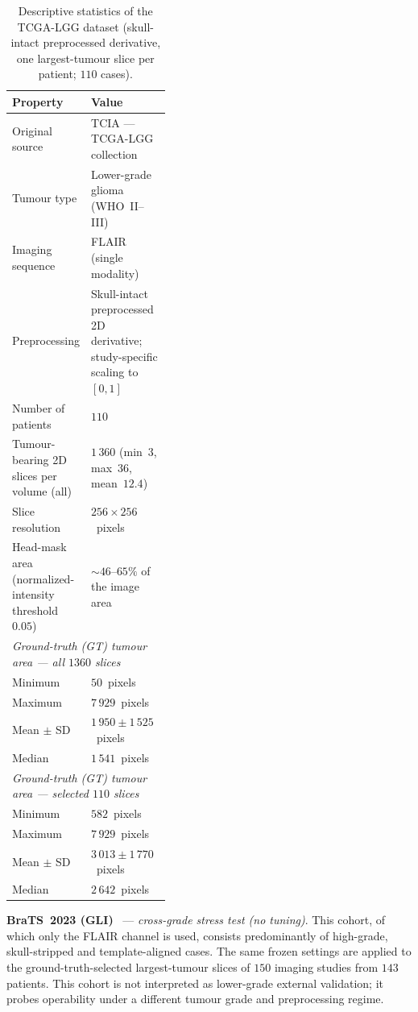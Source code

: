 \documentclass[11pt,a4paper]{article}
\begin{document}
\begin{table}[H]\centering
\caption{Descriptive statistics of the TCGA-LGG dataset (skull-intact
preprocessed derivative, one largest-tumour
slice per patient; $110$ cases).}\label{tab:tcga-stats}
\begin{tabularx}{\linewidth}{@{}p{0.39\linewidth}>{\raggedleft\arraybackslash}X@{}}
\toprule
Property & Value \\
\midrule
Original source & TCIA --- TCGA-LGG collection~\cite{buda2019} \\
Tumour type & Lower-grade glioma (WHO~II--III) \\
Imaging sequence & FLAIR (single modality) \\
Preprocessing & Skull-intact preprocessed 2D derivative; study-specific scaling to $[0,1]$ \\
Number of patients & $110$ \\
Tumour-bearing 2D slices per volume (all) & $1\,360$ (min~$3$, max~$36$, mean~$12.4$) \\
Slice resolution & $256\times 256$~pixels \\
Head-mask area (normalized-intensity threshold $0.05$) & $\sim$$46$--$65\%$ of the image area \\
\midrule
\multicolumn{2}{l}{\emph{Ground-truth (GT) tumour area --- all $1360$ slices}} \\
\quad Minimum & $50$~pixels \\
\quad Maximum & $7\,929$~pixels \\
\quad Mean $\pm$ SD & $1\,950 \pm 1\,525$~pixels \\
\quad Median & $1\,541$~pixels \\
\midrule
\multicolumn{2}{l}{\emph{Ground-truth (GT) tumour area --- selected $110$ slices}} \\
\quad Minimum & $582$~pixels \\
\quad Maximum & $7\,929$~pixels \\
\quad Mean $\pm$ SD & $3\,013 \pm 1\,770$~pixels \\
\quad Median & $2\,642$~pixels \\
\bottomrule
\end{tabularx}
\end{table}

\textbf{BraTS~2023 (GLI)}~\cite{menze2015,bakas2017,baid2021,bonato2025} --- \emph{cross-grade
stress test (no tuning)}. This cohort, of which only the FLAIR channel is used,
consists predominantly of high-grade, skull-stripped and template-aligned cases.
The same frozen settings are applied to the ground-truth-selected largest-tumour
slices of $150$ imaging studies from $143$ patients. This cohort is not interpreted as lower-grade external
validation; it probes operability under a different tumour grade and
preprocessing regime.
\end{document}
